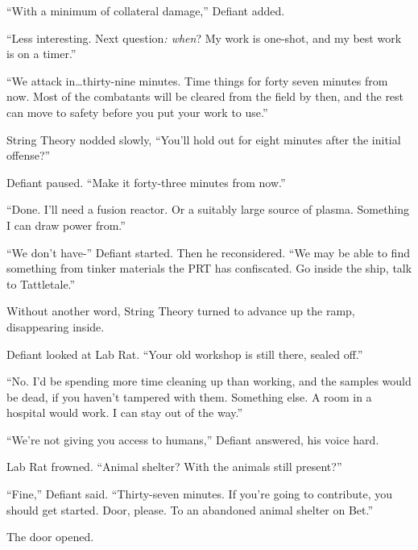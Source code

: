 ``With a minimum of collateral damage,'' Defiant added.



``Less interesting.  Next question\emph{: when}?  My work is one-shot, and my best work is on a timer.''



``We attack in\ldots thirty-nine minutes.  Time things for forty seven minutes from now.  Most of the combatants will be cleared from the field by then, and the rest can move to safety before you put your work to use.''



String Theory nodded slowly, ``You'll hold out for eight minutes after the initial offense?''



Defiant paused.  ``Make it forty-three minutes from now.''



``Done.  I'll need a fusion reactor.  Or a suitably large source of plasma.  Something I can draw power from.''



``We don't have-'' Defiant started.  Then he reconsidered.  ``We may be able to find something from tinker materials the PRT has confiscated.  Go inside the ship, talk to Tattletale.''



Without another word, String Theory turned to advance up the ramp, disappearing inside.



Defiant looked at Lab Rat.  ``Your old workshop is still there, sealed off.''



``No.  I'd be spending more time cleaning up than working, and the samples would be dead, if you haven't tampered with them.  Something else.  A room in a hospital would work.  I can stay out of the way.''



``We're not giving you access to humans,'' Defiant answered, his voice hard.



Lab Rat frowned.  ``Animal shelter?  With the animals still present?''



``Fine,'' Defiant said.  ``Thirty-seven minutes.  If you're going to contribute, you should get started.  Door, please.  To an abandoned animal shelter on Bet.''



The door opened.



